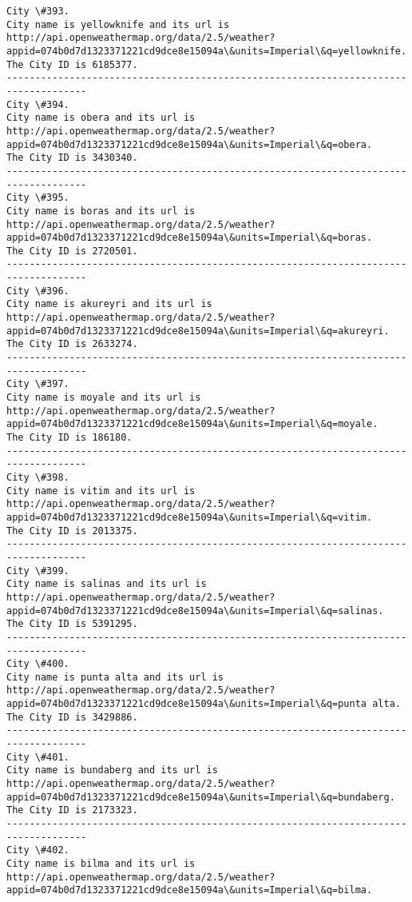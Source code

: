 \documentclass[11pt]{article}
\begin{document}
\begin{Verbatim}[commandchars=\\\{\}]
City \#393.
City name is yellowknife and its url is http://api.openweathermap.org/data/2.5/weather?appid=074b0d7d1323371221cd9dce8e15094a\&units=Imperial\&q=yellowknife.
The City ID is 6185377.
------------------------------------------------------------------------------------
City \#394.
City name is obera and its url is http://api.openweathermap.org/data/2.5/weather?appid=074b0d7d1323371221cd9dce8e15094a\&units=Imperial\&q=obera.
The City ID is 3430340.
------------------------------------------------------------------------------------
City \#395.
City name is boras and its url is http://api.openweathermap.org/data/2.5/weather?appid=074b0d7d1323371221cd9dce8e15094a\&units=Imperial\&q=boras.
The City ID is 2720501.
------------------------------------------------------------------------------------
City \#396.
City name is akureyri and its url is http://api.openweathermap.org/data/2.5/weather?appid=074b0d7d1323371221cd9dce8e15094a\&units=Imperial\&q=akureyri.
The City ID is 2633274.
------------------------------------------------------------------------------------
City \#397.
City name is moyale and its url is http://api.openweathermap.org/data/2.5/weather?appid=074b0d7d1323371221cd9dce8e15094a\&units=Imperial\&q=moyale.
The City ID is 186180.
------------------------------------------------------------------------------------
City \#398.
City name is vitim and its url is http://api.openweathermap.org/data/2.5/weather?appid=074b0d7d1323371221cd9dce8e15094a\&units=Imperial\&q=vitim.
The City ID is 2013375.
------------------------------------------------------------------------------------
City \#399.
City name is salinas and its url is http://api.openweathermap.org/data/2.5/weather?appid=074b0d7d1323371221cd9dce8e15094a\&units=Imperial\&q=salinas.
The City ID is 5391295.
------------------------------------------------------------------------------------
City \#400.
City name is punta alta and its url is http://api.openweathermap.org/data/2.5/weather?appid=074b0d7d1323371221cd9dce8e15094a\&units=Imperial\&q=punta alta.
The City ID is 3429886.
------------------------------------------------------------------------------------
City \#401.
City name is bundaberg and its url is http://api.openweathermap.org/data/2.5/weather?appid=074b0d7d1323371221cd9dce8e15094a\&units=Imperial\&q=bundaberg.
The City ID is 2173323.
------------------------------------------------------------------------------------
City \#402.
City name is bilma and its url is http://api.openweathermap.org/data/2.5/weather?appid=074b0d7d1323371221cd9dce8e15094a\&units=Imperial\&q=bilma.

\end{Verbatim}
\end{document}
